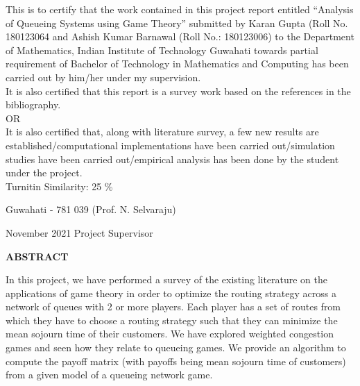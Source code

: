 \documentclass[12pt,a4paper]{report}
\theoremstyle{plain}
\theoremstyle{definition}
\theoremstyle{remark}
\begin{document}
\noindent
This is to certify that the work contained in this project report entitled 
“Analysis of Queueing Systems using Game Theory” submitted by Karan Gupta (Roll No. 180123064 and Ashish Kumar Barnawal (Roll No.: 180123006) 
to the Department of Mathematics, Indian Institute of Technology Guwahati towards partial requirement of
Bachelor of Technology in Mathematics and Computing has been carried out by him/her under
my supervision. \\

\noindent
It is also certified that this report is a survey work based on the references
in the bibliography.\\

OR\\

\noindent
It is also certified that, along with literature survey,
a few new results are established/computational implementations have been carried
out/simulation studies have been carried out/empirical analysis
has been done by the student under the project.\\

\noindent
Turnitin Similarity: 25 \%
%

\vspace{4cm}

\noindent Guwahati - 781 039 \hfill (Prof. N. Selvaraju)

\noindent November 2021 \hfill Project Supervisor

\clearpage

\begin{center}
{\Large{\bf{ABSTRACT}}}
\end{center}


In this project, we have performed a survey of the existing literature on the applications of game theory in order to optimize the routing strategy across a network of queues with 2 or more players. Each player has a set of routes from which they have to choose a routing strategy such that they can minimize the mean sojourn time of their customers. We have explored weighted congestion games and seen how they relate to queueing games. We provide an algorithm to compute the payoff matrix (with payoffs being mean sojourn time of customers) from a given model of a queueing network game. 

\clearpage



\tableofcontents
\clearpage
\listoffigures
\listoftables


\newpage

\setcounter{page}{1}














\nocite{laan}\nocite{rqhassin}\nocite{stidham}\nocite{gross}\nocite{osborne}\nocite{ferreira}



\end{document}
